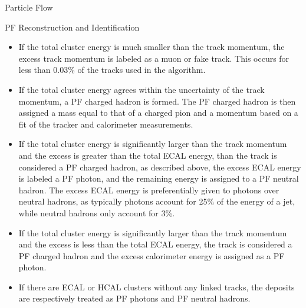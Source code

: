 \begin{section}{Particle Flow}
\begin{subsection}{PF Reconstruction and Identification}
\begin{itemize}
\item If the total cluster energy is much smaller than the track momentum, the excess track momentum is labeled as a muon or fake track.
This occurs for less than 0.03\% of the tracks used in the algorithm.
\item If the total cluster energy agrees within the uncertainty of the track momentum, a PF charged hadron is formed.
The PF charged hadron is then assigned a mass equal to that of a charged pion and a momentum based on a fit of the tracker and calorimeter measurements.
\item If the total cluster energy is significantly larger than the track momentum and the excess is greater than the total ECAL energy, than the track is considered a PF charged hadron, as described above, the excess ECAL energy is labeled a PF photon, and the remaining energy is assigned to a PF neutral hadron.
The excess ECAL energy is preferentially given to photons over neutral hadrons, as typically photons account for 25\% of the energy of a jet, while neutral hadrons only account for 3\%.
\item If the total cluster energy is significantly larger than the track momentum and the excess is less than the total ECAL energy, the track is considered a PF charged hadron and the excess calorimeter energy is assigned as a PF photon.
\item If there are ECAL or HCAL clusters without any linked tracks, the deposits are respectively treated as PF photons and PF neutral hadrons.
\end{itemize}

\end{subsection}

\end{section}

